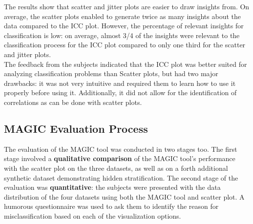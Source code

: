 \documentclass[11pt]{article}
\begin{document}
The results show that scatter and jitter plots are easier to draw insights from. On average, the scatter plots enabled to generate twice as many insights about the data compared to the ICC plot. However, the percentage of relevant insights for classification is low: on average, almost 3/4 of the insights were relevant to the classification process for the ICC plot compared to only one third for the scatter and jitter plots.\\
The feedback from the subjects indicated that the ICC plot was better suited for analyzing classification problems than Scatter plots, but had two major drawbacks: it was not very intuitive and required them to learn how to use it properly before using it. Additionally, it did not allow for the identification of correlations as can be done with scatter plots.

\subsection{MAGIC Evaluation Process}\label{MAGIC Evaluation Process}
The evaluation of the MAGIC tool was conducted in two stages too. The first stage involved a \textbf{qualitative comparison} of the MAGIC tool's performance with the scatter plot on the three datasets, as well as on a forth additional synthetic dataset demonstrating hidden stratification. The second stage of the evaluation was \textbf{quantitative}: the subjects were presented with the data distribution of the four datasets using both the MAGIC tool and scatter plot. A humorous questionnaire was used to ask them to identify the reason for misclassification based on each of the visualization options.
\end{document}
